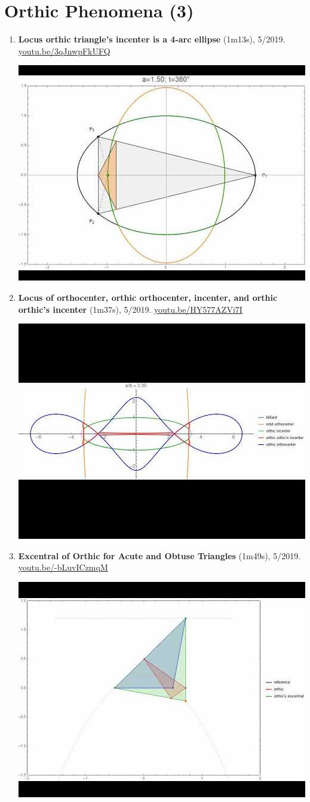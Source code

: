 \documentclass[12pt]{article}
\begin{document}
\section{Orthic Phenomena (3)}

\begin{enumerate}[resume]
\item \textbf{Locus orthic triangle's incenter is a 4-arc ellipse} (1m13s), 5/2019. \href{https://youtu.be/3qJnwpFkUFQ}{\url{youtu.be/3qJnwpFkUFQ}}
\begin{center}\includegraphics[width=.5\textwidth]{pics/3qJnwpFkUFQ.jpg}\end{center}
% 
\item \textbf{Locus of orthocenter, orthic orthocenter, incenter, and orthic orthic's incenter} (1m37s), 5/2019. \href{https://youtu.be/HY577AZVi7I}{\url{youtu.be/HY577AZVi7I}}
\begin{center}\includegraphics[width=.5\textwidth]{pics/HY577AZVi7I.jpg}\end{center}
% 
\item \textbf{Excentral of Orthic for Acute and Obtuse Triangles} (1m49s), 5/2019. \href{https://youtu.be/-bLuvICzmqM}{\url{youtu.be/-bLuvICzmqM}}
\begin{center}\includegraphics[width=.5\textwidth]{pics/-bLuvICzmqM.jpg}\end{center}
% 
\end{enumerate}
\end{document}
